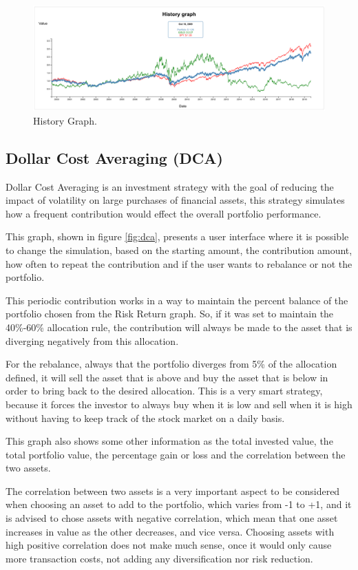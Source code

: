 \documentclass{article}
\begin{document}
\begin{figure}
  \includegraphics[scale=0.25]{images/history.png}
  \centering
  \caption{History Graph.}
  \label{fig:history}
\end{figure}

\subsection{Dollar Cost Averaging (DCA)}

Dollar Cost Averaging is an investment strategy with the goal of reducing the impact of volatility on large purchases of financial assets, this strategy simulates how a frequent contribution would effect the overall portfolio performance.

This graph, shown in figure \ref{fig:dca}, presents a user interface where it is possible to change the simulation, based on the starting amount, the contribution amount, how often to repeat the contribution and if the user wants to rebalance or not the portfolio.

This periodic contribution works in a way to maintain the percent balance of the portfolio chosen from the Risk Return graph. So, if it was set to maintain the 40\%-60\% allocation rule, the contribution will always be made to the asset that is diverging negatively from this allocation.

For the rebalance, always that the portfolio diverges from 5\% of the allocation defined, it will sell the asset that is above and buy the asset that is below in order to bring back to the desired allocation. This is a very smart strategy, because it forces the investor to always buy when it is low and sell when it is high without having to keep track of the stock market on a daily basis.

This graph also shows some other information as the total invested value, the total portfolio value, the percentage gain or loss and the correlation between the two assets.

The correlation between two assets is a very important aspect to be considered when choosing an asset to add to the portfolio, which varies from -1 to +1, and it is advised to chose assets with negative correlation, which mean that one asset increases in value as the other decreases, and vice versa. Choosing assets with high positive correlation does not make much sense, once it would only cause more transaction costs, not adding any diversification nor risk reduction.
\end{document}
